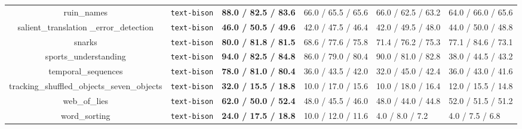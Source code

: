 \begin{table}[H]
\begin{center}
{\begin{tabular}{cP{1.2cm}P{2.2cm}P{2.2cm}P{2.2cm}P{2.2cm}}
ruin\_names & \texttt{text-bison} & \textbf{88.0 / 82.5 / 83.6} & 66.0 / 65.5 / 65.6 & 66.0 / 62.5 / 63.2 & 64.0 / 66.0 / 65.6 \\
salient\_translation \_error\_detection & \texttt{text-bison} & \textbf{46.0 / 50.5 / 49.6} & 42.0 / 47.5 / 46.4 & 42.0 / 49.5 / 48.0 & 44.0 / 50.0 / 48.8 \\
snarks & \texttt{text-bison} & \textbf{80.0 / 81.8 / 81.5} & 68.6 / 77.6 / 75.8 & 71.4 / 76.2 / 75.3 & 77.1 / 84.6 / 73.1 \\
sports\_understanding & \texttt{text-bison} & \textbf{94.0 / 82.5 / 84.8} & 86.0 / 79.0 / 80.4 & 90.0 / 81.0 / 82.8 & 38.0 / 44.5 / 43.2 \\
temporal\_sequences & \texttt{text-bison} & \textbf{78.0 / 81.0 / 80.4} & 36.0 / 43.5 / 42.0 & 32.0 / 45.0 / 42.4 & 36.0 / 43.0 / 41.6 \\
tracking\_shuffled\_objects\_seven\_objects & \texttt{text-bison} & \textbf{32.0 / 15.5 / 18.8} & 10.0 / 17.0 / 15.6 & 10.0 / 18.0 / 16.4 & 12.0 / 15.5 / 14.8 \\
web\_of\_lies & \texttt{text-bison} & \textbf{62.0 / 50.0 / 52.4} & 48.0 / 45.5 / 46.0 & 48.0 / 44.0 / 44.8 & 52.0 / 51.5 / 51.2 \\
word\_sorting & \texttt{text-bison} & \textbf{24.0 / 17.5 / 18.8} & 10.0 / 12.0 / 11.6 & 4.0 / 8.0 / 7.2 & 4.0 / 7.5 / 6.8 \\
\bottomrule
\end{tabular}
}
\end{center}
\label{table:palm2_scores_on_bbh_tasks}
\end{table}


